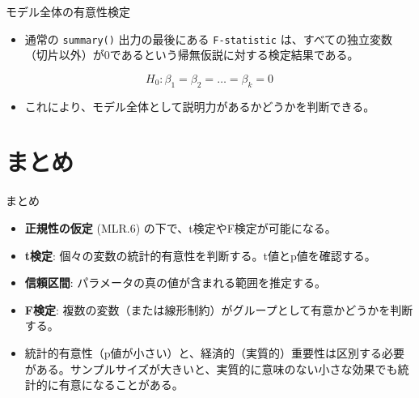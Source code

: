 \documentclass[
  ignorenonframetext,
]{beamer}
\providecommand{\tightlist}{%
  \setlength{\itemsep}{0pt}\setlength{\parskip}{0pt}}
\begin{document}
\begin{frame}[fragile]{モデル全体の有意性検定}
\label{ux30e2ux30c7ux30ebux5168ux4f53ux306eux6709ux610fux6027ux691cux5b9a}
\begin{itemize}
\tightlist
\item
  通常の \texttt{summary()} 出力の最後にある \texttt{F-statistic}
  は、すべての独立変数（切片以外）が0であるという帰無仮説に対する検定結果である。
\end{itemize}

\[ H_0: \beta_1 = \beta_2 = \dots = \beta_k = 0 \]

\begin{itemize}
\tightlist
\item
  これにより、モデル全体として説明力があるかどうかを判断できる。
\end{itemize}
\end{frame}

\section{まとめ}\label{ux307eux3068ux3081}

\begin{frame}{まとめ}
\label{ux307eux3068ux3081-1}
\begin{itemize}
\tightlist
\item
  \textbf{正規性の仮定} (MLR.6) の下で、t検定やF検定が可能になる。
\item
  \textbf{t検定}:
  個々の変数の統計的有意性を判断する。t値とp値を確認する。
\item
  \textbf{信頼区間}: パラメータの真の値が含まれる範囲を推定する。
\item
  \textbf{F検定}:
  複数の変数（または線形制約）がグループとして有意かどうかを判断する。
\item
  統計的有意性（p値が小さい）と、経済的（実質的）重要性は区別する必要がある。サンプルサイズが大きいと、実質的に意味のない小さな効果でも統計的に有意になることがある。
\end{itemize}
\end{frame}
\end{document}
